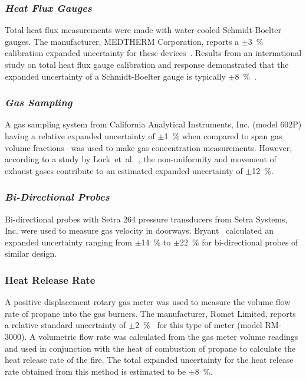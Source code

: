 \subsubsection*{\textit{Heat Flux Gauges}}
Total heat flux measurements were made with water-cooled Schmidt-Boelter gauges. The manufacturer, MEDTHERM Corporation, reports a $\pm$3~\% calibration expanded uncertainty for these devices~\cite{Medtherm:2003}. Results from an international study on total heat flux gauge calibration and response demonstrated that the expanded uncertainty of a Schmidt-Boelter gauge is typically $\pm$8~\%~\cite{Pitts:2006}.

\subsubsection*{\textit{Gas Sampling}}
A gas sampling system from California Analytical Instruments, Inc. (model 602P) having a relative expanded uncertainty of $\pm$1~\% when compared to span gas volume fractions~\cite{Bundy:2007} was used to make gas concentration measurements. However, according to a study by Lock~et~al.~\cite{Lock:1}, the non-uniformity and movement of exhaust gases contribute to an estimated expanded uncertainty of $\pm$12~\%.

\subsubsection*{\textit{Bi-Directional Probes}}
Bi-directional probes with Setra 264 pressure transducers from Setra Systems, Inc. were used to measure gas velocity in doorways. Bryant~\cite{Bryant:FSJ2009} calculated an expanded uncertainty ranging from $\pm$14~\% to $\pm$22~\% for bi-directional probes of similar design.

\subsubsection*{Heat Release Rate}
A positive displacement rotary gas meter was used to measure the volume flow rate of propane into the gas burners. The manufacturer, Romet Limited, reports a relative standard uncertainty of $\pm$2~\%~\cite{Romet:2014} for this type of meter (model RM-3000). A volumetric flow rate was calculated from the gas meter volume readings and used in conjunction with the heat of combustion of propane to calculate the heat release rate of the fire. The total expanded uncertainty for the heat release rate obtained from this method is estimated to be $\pm8$~\%.